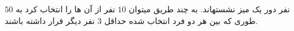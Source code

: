 \exercise
$50$
نفر دور یک میز نشستهاند. به چند طریق میتوان
$10$
نفر از آن ها را انتخاب کرد به طوری که بین هر دو فرد انتخاب شده حداقل
$3$
نفر دیگر قرار داشته باشند.